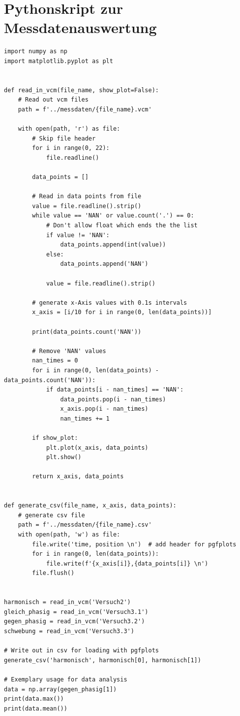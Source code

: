 \documentclass{article}
\begin{document}
\section{Pythonskript zur Messdatenauswertung}
\begin{verbatim}
import numpy as np
import matplotlib.pyplot as plt


def read_in_vcm(file_name, show_plot=False):
    # Read out vcm files
    path = f'../messdaten/{file_name}.vcm'

    with open(path, 'r') as file:
        # Skip file header
        for i in range(0, 22):
            file.readline()

        data_points = []

        # Read in data points from file
        value = file.readline().strip()
        while value == 'NAN' or value.count('.') == 0: 
            # Don't allow float which ends the the list
            if value != 'NAN':
                data_points.append(int(value))
            else:
                data_points.append('NAN')

            value = file.readline().strip()

        # generate x-Axis values with 0.1s intervals
        x_axis = [i/10 for i in range(0, len(data_points))]

        print(data_points.count('NAN'))

        # Remove 'NAN' values
        nan_times = 0
        for i in range(0, len(data_points) - data_points.count('NAN')):
            if data_points[i - nan_times] == 'NAN':
                data_points.pop(i - nan_times)
                x_axis.pop(i - nan_times)
                nan_times += 1

        if show_plot:
            plt.plot(x_axis, data_points)
            plt.show()

        return x_axis, data_points


def generate_csv(file_name, x_axis, data_points):
    # generate csv file
    path = f'../messdaten/{file_name}.csv'
    with open(path, 'w') as file:
        file.write('time, position \n')  # add header for pgfplots
        for i in range(0, len(data_points)):
            file.write(f'{x_axis[i]},{data_points[i]} \n')
        file.flush()


harmonisch = read_in_vcm('Versuch2')
gleich_phasig = read_in_vcm('Versuch3.1')
gegen_phasig = read_in_vcm('Versuch3.2')
schwebung = read_in_vcm('Versuch3.3')

# Write out in csv for loading with pgfplots
generate_csv('harmonisch', harmonisch[0], harmonisch[1])

# Exemplary usage for data analysis
data = np.array(gegen_phasig[1])
print(data.max())
print(data.mean())


\end{verbatim}
\end{document}

